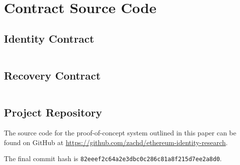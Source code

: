 \chapter{Contract Source Code}

\begin{spacing}{1}
  \section{Identity Contract}
  \label{apd:identity-contract}
  \inputminted{C}{./code/Identity.sol.txt}

  \section{Recovery Contract}
  \label{apd:recovery-contract}
  \inputminted{C}{./code/Recovery.sol.txt}
\end{spacing}

\section{Project Repository}
The source code for the proof-of-concept system outlined in this paper can be found on GitHub at \url{https://github.com/zachd/ethereum-identity-research}. 

The final commit hash is \texttt{82eeef2c64a2e3dbc0c286c81a8f215d7ee2a8d0}.